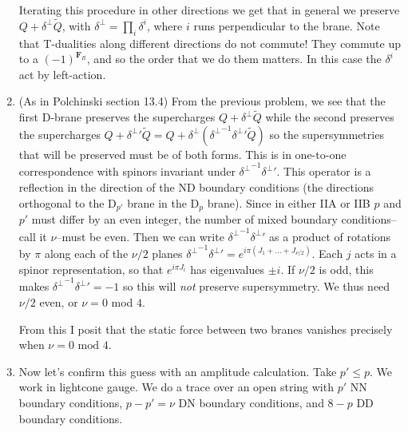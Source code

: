\documentclass[11pt, class=article, crop=false]{standalone}
\begin{document}
\begin{enumerate}
	Iterating this procedure in other directions we get that in general we preserve $Q + \delta^\perp \tilde Q$, with $\delta^\perp = \prod_{i} \delta^i$, where $i$ runs perpendicular to the brane. Note that T-dualities along different directions do not commute! They commute up to a $(-1)^{\mathbf{F}_R}$, and so the order that we do them matters. In this case the $\delta^i$ act by left-action.
	
	\item (As in Polchinski section 13.4) From the previous problem, we see that the first D-brane preserves the supercharges $Q + \delta^\perp \tilde Q$ while the second preserves the supercharges $Q + {\delta^\perp}' \tilde Q = Q + \delta^\perp ({\delta^\perp}^{-1} {\delta^\perp}' \tilde Q)$ so the supersymmetries that will be preserved must be of both forms. This is in one-to-one correspondence with spinors invariant under ${\delta^\perp}^{-1} {\delta^\perp}'$. This operator is a reflection in the direction of the ND boundary conditions (the directions orthogonal to the D$_{p'}$ brane in the D$_p$ brane). Since in either IIA or IIB $p$ and $p'$ must differ by an even integer, the number of mixed boundary conditions--call it $\nu$--must be even. Then we can write ${\delta^\perp}^{-1} {\delta^\perp}'$ as a product of rotations by $\pi$ along each of the $\nu/2$ planes ${\delta^\perp}^{-1} {\delta^\perp}' = e^{i \pi (J_1 + \dots + J_{\nu/2})}$. Each $j$ acts in a spinor representation, so that $e^{i \pi J_i}$ has eigenvalues $\pm i$. If $\nu/2$ is odd, this makes ${\delta^\perp}^{-1} {\delta^\perp}' = -1$ so this will \emph{not} preserve supersymmetry. We thus need $\nu/2$ even, or $\nu = 0$ mod $4$.
	
	
	From this I posit that the static force between two branes vanishes precisely when $\nu = 0 \text{ mod } 4$.
	
	\item Now let's confirm this guess with an amplitude calculation. Take $p' \leq p$. We work in lightcone gauge. We do a trace over an open string with $p'$ NN boundary conditions, $p-p' = \nu$ DN boundary conditions, and $8-p$ DD boundary conditions. 
	

\end{enumerate}
\end{document}
